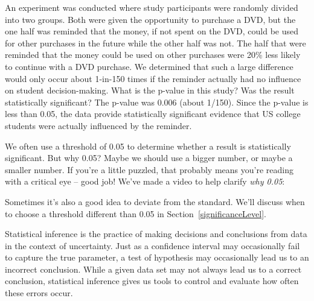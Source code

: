 


\begin{example}{An experiment was conducted where study participants were randomly divided into two groups. Both were given the opportunity to purchase a DVD, but the one half was reminded that the money, if not spent on the DVD, could be used for other purchases in the future while the other half was not. The half that were reminded that the money could be used on other purchases were 20\% less likely to continue with a DVD purchase. We determined that such a large difference would only occur about 1-in-150 times if the reminder actually had no influence on student decision-making. What is the p-value in this study? Was the result statistically significant?}
The p-value was 0.006 (about 1/150). Since the p-value is less than 0.05, the data provide statistically significant evidence that US college students were actually influenced by the reminder.
\end{example}

\begin{termBox}{
We often use a threshold of 0.05 to determine whether a result is statistically significant. But why 0.05? Maybe we should use a bigger number, or maybe a smaller number. If you're a little puzzled, that probably means you're reading with a critical eye -- good job! We've made a video to help clarify \emph{why 0.05}:
\begin{center}
\end{center}
Sometimes it's also a good idea to deviate from the standard. We'll discuss when to choose a threshold different than 0.05 in Section~\ref{significanceLevel}.\vspace{0.5mm}}
\end{termBox}

Statistical inference is the practice of making decisions and conclusions from data in the context of uncertainty. Just as a confidence interval may occasionally fail to capture the true parameter, a test of hypothesis may occasionally lead us to an incorrect conclusion. While a given data set may not always lead us to a correct conclusion, statistical inference gives us tools to control and evaluate how often these errors occur.


